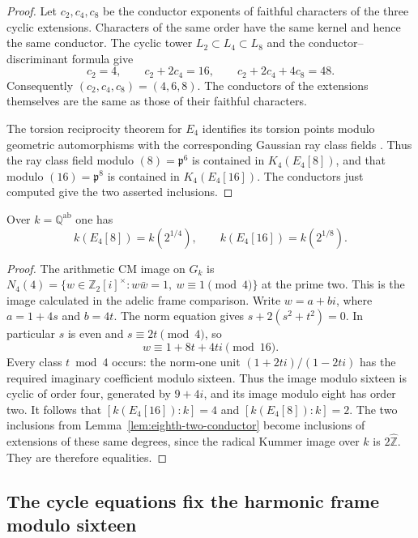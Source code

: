 \begin{proof}
Let $c_2,c_4,c_8$ be the conductor exponents of faithful characters
of the three cyclic extensions.  Characters of the same order
have the same kernel and hence the same conductor.  The cyclic
tower $L_2\subset L_4\subset L_8$ and the conductor--discriminant
formula \cite[V, Theorem~3.27 and Remark~3.28, p.~165]{MilneCFT}
give
\[
 c_2=4,\qquad c_2+2c_4=16,\qquad
 c_2+2c_4+4c_8=48.
\]
Consequently $(c_2,c_4,c_8)=(4,6,8)$.
The conductors of the extensions themselves are the same as
those of their faithful characters.

The torsion reciprocity theorem for $E_4$ identifies its
torsion points modulo geometric automorphisms with the
corresponding Gaussian ray class fields
\cite[Theorem~12.27, printed p.~124]{MilneMF110}.
Thus the ray class field modulo $(8)=\mathfrak p^6$ is contained
in $K_4(E_4[8])$, and that modulo $(16)=\mathfrak p^8$ is
contained in $K_4(E_4[16])$.  The conductors just computed
give the two asserted inclusions.
\end{proof}

\begin{proposition}\label{prop:eighth-two-division-fields}
Over $k=\mathbb Q^{\mathrm{ab}}$ one has
\[
 k(E_4[8])=k(2^{1/4}),\qquad
 k(E_4[16])=k(2^{1/8}).
\]
\end{proposition}

\begin{proof}
The arithmetic CM image on $G_k$ is
$N_4(4)=\{w\in\mathbb Z_2[i]^\times:
w\bar w=1,\ w\equiv1\pmod4\}$ at the prime two.
This is the image calculated in the adelic frame comparison.
Write $w=a+bi$, where $a=1+4s$ and $b=4t$.
The norm equation gives
$s+2(s^2+t^2)=0$.  In particular $s$ is even and
$s\equiv2t\pmod4$, so
\begin{equation}
 w\equiv1+8t+4ti\pmod{16}.
 \label{eq:eighth-two-norm-reduction}
\end{equation}
Every class $t\bmod4$ occurs: the norm-one unit
$(1+2ti)/(1-2ti)$ has the required imaginary coefficient modulo
sixteen.  Thus the image modulo sixteen is cyclic of order four,
generated by $9+4i$, and its image modulo eight has order two.
It follows that
$[k(E_4[16]):k]=4$ and $[k(E_4[8]):k]=2$.
The two inclusions from Lemma~\ref{lem:eighth-two-conductor}
become inclusions of extensions of these same degrees, since
the radical Kummer image over $k$ is $2\widehat{\mathbb Z}$.
They are therefore equalities.
\end{proof}

\subsection{The cycle equations fix the harmonic frame modulo sixteen}

